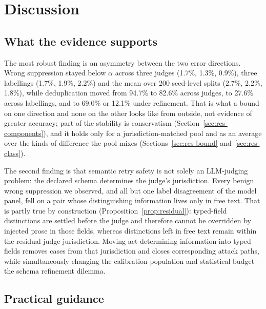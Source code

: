 \section{Discussion}\label{sec:discussion}

\subsection{What the evidence supports}

The most robust finding is an asymmetry between the two error directions. Wrong suppression stayed below $\alpha$ across three judges (1.7\%, 1.3\%, 0.9\%), three labellings (1.7\%, 1.9\%, 2.2\%) and the mean over 200 seed-level splits (2.7\%, 2.2\%, 1.8\%), while deduplication moved from 94.7\% to 82.6\% across judges, to 27.6\% across labellings, and to 69.0\% or 12.1\% under refinement. That is what a bound on one direction and none on the other looks like from outside, not evidence of greater accuracy; part of the stability is conservatism (Section~\ref{sec:res-components}), and it holds only for a jurisdiction-matched pool and as an average over the kinds of difference the pool mixes (Sections~\ref{sec:res-bound} and~\ref{sec:res-class}).

The second finding is that semantic retry safety is not solely an LLM-judging problem: the declared schema determines the judge's jurisdiction. Every benign wrong suppression we observed, and all but one label disagreement of the model panel, fell on a pair whose distinguishing information lives only in free text. That is partly true by construction (Proposition~\ref{prop:residual}): typed-field distinctions are settled before the judge and therefore cannot be overridden by injected prose in those fields, whereas distinctions left in free text remain within the residual judge jurisdiction. Moving act-determining information into typed fields removes cases from that jurisdiction and closes corresponding attack paths, while simultaneously changing the calibration population and statistical budget---the schema refinement dilemma.

\subsection{Practical guidance}

